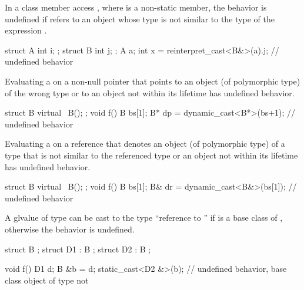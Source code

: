 
\pnum
In a class member access ,
where  is a non-static member,
the behavior is undefined
if  refers to an object
whose type is not similar
to the type of the expression .

\pnum
\begin{example}
\begin{codeblock}
struct A { int i; };
struct B { int j; };
A a;
int x = reinterpret_cast<B&>(a).j;  // undefined behavior
\end{codeblock}
\end{example}


\pnum
Evaluating a  on a non-null pointer
that points to an object (of polymorphic type) of the wrong type
or to an object not within its lifetime
has undefined behavior.

\pnum
\begin{example}
\begin{codeblock}
struct B { virtual ~B(); };
void f() {
  B bs[1];
  B* dp = dynamic_cast<B*>(bs+1);   // undefined behavior
}
\end{codeblock}
\end{example}


\pnum
Evaluating a  on a reference
that denotes an object (of polymorphic type)
of a type that is not similar to the referenced type
or an object not within its lifetime
has undefined behavior.

\pnum
\begin{example}
\begin{codeblock}
struct B { virtual ~B(); };
void f() {
  B bs[1];
  B& dr = dynamic_cast<B&>(bs[1]);  // undefined behavior
}
\end{codeblock}
\end{example}


\pnum
A glvalue of type 
can be cast to the type ``reference to ''
if  is a base class of ,
otherwise the behavior is undefined.

\pnum
\begin{example}
\begin{codeblock}
struct B {};
struct D1 : B {};
struct D2 : B {};

void f() {
  D1 d;
  B &b = d;
  static_cast<D2 &>(b); // undefined behavior, base class object of type  not 
}
\end{codeblock}
\end{example}

